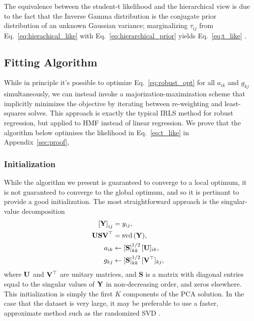 \documentclass[onecolumn,floatfix]{aastex631}
\DeclareMathOperator{\svd}{svd}
\begin{document}
The equivalence between the student-t likelihood and the hierarchical view is due to the fact that the Inverse Gamma distribution is the conjugate prior distribution of an unknown Gaussian variance; marginalizing $\tau_{ij}$ from Eq.~\eqref{eq:hierachical_like} with Eq.~\eqref{eq:hierarchical_prior} yields Eq.~\eqref{eq:t_like} \citep[e.g.][]{lange1989}.

\subsection{Fitting Algorithm}

While in principle it's possible to optimize Eq.~\eqref{eq:robust_opt} for all $a_{ik}$ and $g_{kj}$ simultaneously, we can instead invoke a majorization-maximization scheme that implicitly minimizes the objective by iterating between re-weighting and least-squares solves.
This approach is exactly the typical IRLS method for robust regression, but applied to HMF instead of linear regression.
We prove that the algorithm below optimises the likelihood in Eq.~\eqref{eq:t_like} in Appendix~\ref{sec:proof}, 

\subsubsection{Initialization}

While the algorithm we present is guaranteed to converge to a local optimum, it is not guaranteed to converge to the global optimum, and so it is pertinant to provide a good initialization.
The most straightforward approach is the singular-value decomposition
\begin{align}
    \left[{\bf Y}\right]_{ij} &= y_{ij}, \\
    {\bf U} {\bf S} {\bf V}^\top &= \svd{\left({\bf Y}\right)}, \\
    a_{ik} &\leftarrow \left[{\bf S}\right]_{kk}^{1/2} [{\bf U}]_{ik}, \\
    g_{kj} &\leftarrow \left[{\bf S}\right]_{kk}^{1/2} [{\bf V}^\top]_{kj},
\end{align}
where ${\bf U}$ and ${\bf V}^\top$ are unitary matrices, and {\bf S} is a matrix with diagonal entries equal to the singular values of ${\bf Y}$ in non-decreasing order, and zeros elsewhere.
This initialization is simply the first $K$ components of the PCA solution.
In the case that the dataset is very large, it may be preferable to use a faster, approximate method such as the randomized SVD \citep{halko2011}.
\end{document}
